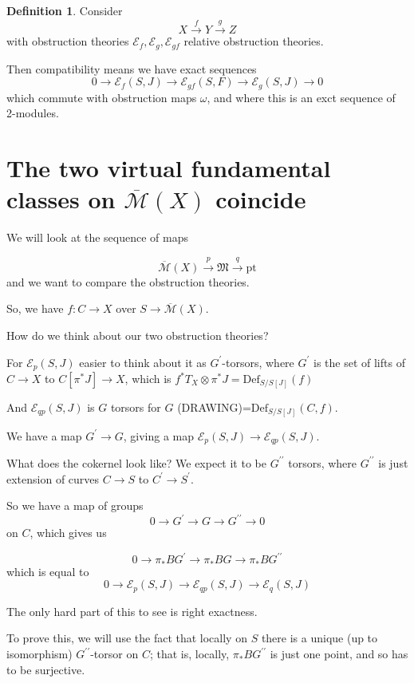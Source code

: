 \documentclass{amsart}
\theoremstyle{definition}
\newtheorem{definition}[dummy]{Definition}
\newcommand{\Def}{\text{Def}}
\newcommand{\Mbar}{\overline{\mathcal{M}}}
\begin{document}
\begin{definition}
Consider $$X\stackrel{f}\to Y\stackrel{g}\to Z$$
with obstruction theories $\mathcal{E}_f, \mathcal{E}_g, \mathcal{E}_{gf}$ relative obstruction theories.  

Then compatibility means we have exact sequences
$$0\to \mathcal{E}_f(S, J)\to \mathcal{E}_{gf}(S, F)\to \mathcal{E}_{g}(S, J)\to 0$$
which commute with obstruction maps $\omega$, and where this is an exct sequence of 2-modules.

\end{definition}

\section{The two virtual fundamental classes on $\Mbar(X)$ coincide}

We will look at the sequence of maps

$$\Mbar(X)\stackrel{p}\to \mathfrak{M}\stackrel{q}\to\text{pt}$$
and we want to compare the obstruction theories.

So, we have $f:C\to X$ over $S\to \Mbar(X)$.  

How do we think about our two obstruction theories?

For $\mathcal{E}_p(S,J)$ easier to think about it as $G^\prime$-torsors, where $G^\prime$ is the set of lifts of $C\to X$ to $C[\pi^* J]\to X$, which is $f^*T_X\otimes\pi^* J=\Def_{S/S[J]}(f)$

And $\mathcal{E}_{qp}(S,J)$ is $G$ torsors for $G$ (DRAWING)=$\Def_{S/S[J]}(C,f)$.

We have a map $G^\prime\to G$, giving a map $\mathcal{E}_p(S,J)\to\mathcal{E}_{qp}(S,J)$.

What does the cokernel look like?  We expect it to be $G^{\prime\prime}$ torsors, where $G^{\prime\prime}$ is just extension of curves $C\to S$ to $C^\prime\to S^\prime$.

So we have a map of groups
$$0\to G^\prime\to G \to G^{\prime\prime}\to 0$$
on $C$, which gives us

$$0\to \pi_*BG^\prime \to \pi_*BG\to \pi_*BG^{\prime\prime}$$
which is equal to 
$$0\to \mathcal{E}_p(S,J)\to \mathcal{E}_{qp}(S,J)\to \mathcal{E}_q(S,J)$$

The only hard part of this to see is right exactness.

To prove this, we will use the fact that locally on $S$ there is a unique (up to isomorphism) $G^{\prime\prime}$-torsor on $C$; that is, locally, $\pi_*BG^{\prime\prime}$ is just one point, and so has to be surjective.
\end{document}

